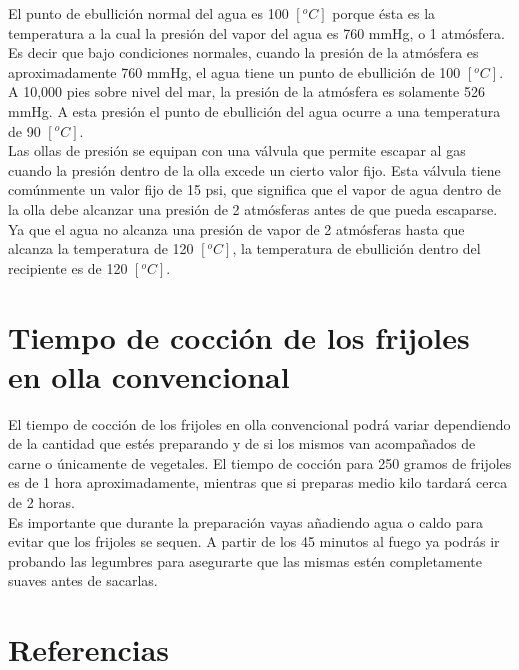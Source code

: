 \documentclass[]{article}
\begin{document}
 El punto de ebullición normal del agua es 100 $[^oC]$ porque ésta es la temperatura a la cual la presión del vapor del agua es 760 mmHg, o 1 atmósfera. Es decir que bajo condiciones normales, cuando la presión de la atmósfera es aproximadamente 760 mmHg, el agua tiene un punto de ebullición de 100 $[^oC]$. A 10,000 pies sobre nivel del mar, la presión de la atmósfera es solamente 526 mmHg. A esta presión el punto de ebullición del agua ocurre a una temperatura de 90 $[^oC]$.\\

Las ollas de presión se equipan con una válvula que permite escapar al gas cuando la presión dentro de la olla excede un cierto valor fijo. Esta válvula tiene comúnmente un valor fijo de 15 psi, que significa que el vapor de agua dentro de la olla debe alcanzar una presión de 2 atmósferas antes de que pueda escaparse. Ya que el agua no alcanza una presión de vapor de 2 atmósferas hasta que alcanza la temperatura de 120 $[^oC]$, la temperatura de ebullición dentro del recipiente es de 120 $[^oC]$. \cite{ebullicion}\\

\section{ Tiempo de cocción de los frijoles en olla convencional}


El tiempo de cocción de los frijoles en olla convencional podrá variar dependiendo de la cantidad que estés preparando y de si los mismos van acompañados de carne o únicamente de vegetales. El tiempo de cocción para 250 gramos de frijoles es de 1 hora aproximadamente, mientras que si preparas medio kilo tardará cerca de 2 horas.\\

Es importante que durante la preparación vayas añadiendo agua o caldo para evitar que los frijoles se sequen. A partir de los 45 minutos al fuego ya podrás ir probando las legumbres para asegurarte que las mismas estén completamente suaves antes de sacarlas.\cite{coccion}\\





\section{Referencias}

%
%
\end{document}
